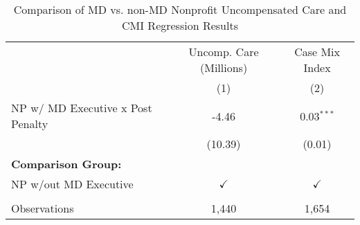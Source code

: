 \begin{table}[htbp]
   \caption{\label{tab:MD_noMD_uncomp_CMI_fullsample} Comparison of MD vs. non-MD Nonprofit Uncompensated Care and CMI Regression Results}
   \bigskip
   \centering
   \begin{tabular}{lcc}
      \toprule
                                        & Uncomp. Care (Millions) & Case Mix Index\\  
                                        & (1)                     & (2)\\  
      \midrule 
      NP w/ MD Executive x Post Penalty & -4.46                   & 0.03$^{***}$\\   
                                        & (10.39)                 & (0.01)\\   
      \textbf{Comparison Group:}        &                         & \\  
      NP w/out MD Executive             & $\checkmark$            & $\checkmark$\\   
       \\
      Observations                      & 1,440                   & 1,654\\  
      \bottomrule
   \end{tabular}
\end{table}

